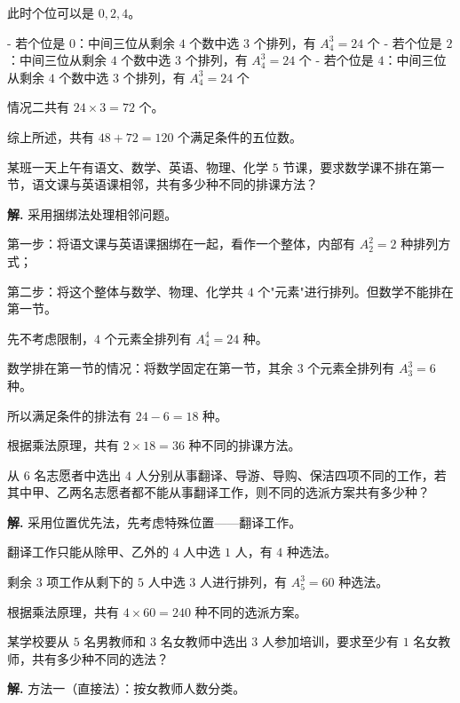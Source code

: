\documentclass[11pt]{ctexrep}
\begin{document}
此时个位可以是 $0, 2, 4$。

- 若个位是 $0$：中间三位从剩余 $4$ 个数中选 $3$ 个排列，有 $A_4^3 = 24$ 个
- 若个位是 $2$：中间三位从剩余 $4$ 个数中选 $3$ 个排列，有 $A_4^3 = 24$ 个
- 若个位是 $4$：中间三位从剩余 $4$ 个数中选 $3$ 个排列，有 $A_4^3 = 24$ 个

情况二共有 $24 \times 3 = 72$ 个。

综上所述，共有 $48 + 72 = 120$ 个满足条件的五位数。

\begin{example}[捆绑法与插空法]
    某班一天上午有语文、数学、英语、物理、化学 $5$ 节课，要求数学课不排在第一节，语文课与英语课相邻，共有多少种不同的排课方法？
\end{example}

\textbf{解.} 采用捆绑法处理相邻问题。

第一步：将语文课与英语课捆绑在一起，看作一个整体，内部有 $A_2^2 = 2$ 种排列方式；

第二步：将这个整体与数学、物理、化学共 $4$ 个"元素"进行排列。但数学不能排在第一节。

先不考虑限制，$4$ 个元素全排列有 $A_4^4 = 24$ 种。

数学排在第一节的情况：将数学固定在第一节，其余 $3$ 个元素全排列有 $A_3^3 = 6$ 种。

所以满足条件的排法有 $24 - 6 = 18$ 种。

根据乘法原理，共有 $2 \times 18 = 36$ 种不同的排课方法。

\begin{realexam}[2025 上海高三一模]
    从 $6$ 名志愿者中选出 $4$ 人分别从事翻译、导游、导购、保洁四项不同的工作，若其中甲、乙两名志愿者都不能从事翻译工作，则不同的选派方案共有多少种？
\end{realexam}

\textbf{解.} 采用位置优先法，先考虑特殊位置——翻译工作。

翻译工作只能从除甲、乙外的 $4$ 人中选 $1$ 人，有 $4$ 种选法。

剩余 $3$ 项工作从剩下的 $5$ 人中选 $3$ 人进行排列，有 $A_5^3 = 60$ 种选法。

根据乘法原理，共有 $4 \times 60 = 240$ 种不同的选派方案。

\begin{realexam}[练习]
    某学校要从 $5$ 名男教师和 $3$ 名女教师中选出 $3$ 人参加培训，要求至少有 $1$ 名女教师，共有多少种不同的选法？
\end{realexam}

\textbf{解.} 方法一（直接法）：按女教师人数分类。
\end{document}
